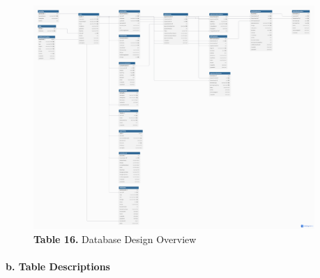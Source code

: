 \documentclass[12pt,a4paper]{article}
\begin{document}
\begin{figure}[H]
    \centering
    \includegraphics[width=0.95\textwidth]{diagrams/Picture/Database.png}
    \caption*{\textbf{Table 16.} Database Design Overview}
\end{figure}



\paragraph{b. Table Descriptions}
\end{document}
